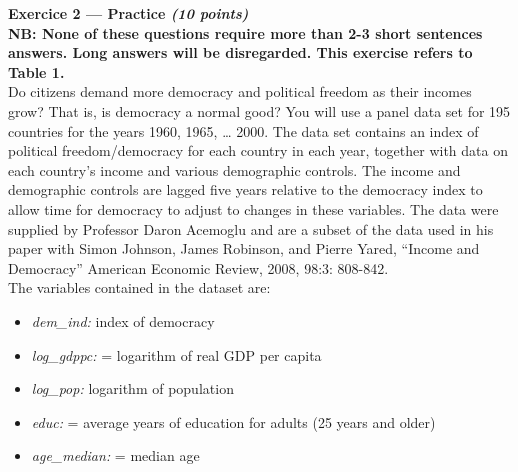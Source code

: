 \documentclass{article}
\begin{document}
\newpage

\textbf{Exercice 2 --- Practice \textit{(10 points)}} \\[1em] %
\textbf{NB: None of these questions require more than 2-3 short sentences answers. Long answers will be disregarded. This exercise refers to Table 1.}\\[1em]

Do citizens demand more democracy and political freedom as their incomes grow? That is, is democracy a normal good? You will use a panel data set for 195 countries for the years 1960, 1965, … 2000.  The data set contains an index of political freedom/democracy for each country in each year, together with data on each country’s income and various demographic controls. The income and demographic controls are lagged five years relative to the democracy index to allow time for democracy to adjust to changes in these variables. The data were supplied by Professor Daron Acemoglu and are a subset of the data used in his paper with Simon Johnson, James Robinson, and Pierre Yared, “Income and Democracy” American Economic Review, 2008, 98:3: 808-842.\\[1em]

The variables contained in the dataset are:

\begin{itemize}
    \item \textit{dem\_ind:} index of democracy
    \item \textit{log\_gdppc:} = logarithm of real GDP per capita
    \item \textit{log\_pop:} logarithm of population
    \item \textit{educ:} = average years of education for adults (25 years and older)
    \item \textit{age\_median:} = median age
\end{itemize}
\end{document}
